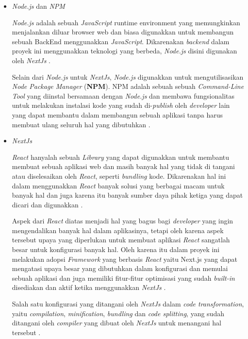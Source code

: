 \documentclass[a4paper]{article}
\begin{document}
\begin{enumerate}[label=\alph*. ]
\begin{enumerate}
\begin{itemize}
                        \item \textit{Node.js} dan \textit{NPM}

                        \textit{Node.js} adalah sebuah \textit{JavaScript} runtime environment yang memungkinkan menjalankan diluar browser web dan biasa digunakkan untuk membangun sebuah BackEnd menggunakkan \textit{JavaScript}. Dikarenakan \textit{backend} dalam proyek ini menggunakkan teknologi yang berbeda, \textit{Node.js} disini digunakan oleh \textit{NextJs} \autocite{Nextjs_use_webpack}.

	                    Selain dari \textit{Node.js} untuk \textit{NextJs}, \textit{Node.js} digunakkan untuk mengutilisasikan \textit{Node Package Manager} (\textbf{NPM}). NPM adalah sebuah sebuah \textit{Command-Line Tool} yang diinstal bersamaan dengan \textit{Node.js} dan membawa fungsionalitas untuk melakukan instalasi kode yang sudah di-\textit{publish} oleh \textit{developer} lain yang dapat membantu dalam membangun sebuah aplikasi tanpa harus membuat ulang seluruh hal yang dibutuhkan \autocite[27-29]{Banks_Porcello_2020}.

                        \item \textit{NextJs}

                        \textit{React} hanyalah sebuah \textit{Library} yang dapat digunakkan untuk membantu membuat sebuah aplikasi web dan masih banyak hal yang tidak di tangani atau diselesaikan oleh \textit{React}, seperti \textit{bundling} kode. Dikarenakan hal ini dalam menggunakkan \textit{React} banyak solusi yang berbagai macam untuk banyak hal dan juga karena itu banyak sumber daya pihak ketiga yang dapat dicari dan digunakkan \autocite{Nextjs_general}.

	                    Aspek dari \textit{React} diatas menjadi hal yang bagus bagi \textit{developer} yang ingin mengendalikan banyak hal dalam aplikasinya, tetapi oleh karena aspek tersebut upaya yang diperlukan untuk membuat aplikasi \textit{React} sangatlah besar untuk konfigurasi banyak hal. Oleh karena itu dalam proyek ini melakukan adopsi \textit{Framework} yang berbasis \textit{React} yaitu Next.js yang dapat mengatasi upaya besar yang dibutuhkan dalam konfigurasi dan memulai sebuah aplikasi dan juga memiliki fitur-fitur optimisasi yang sudah \textit{built-in} disediakan dan aktif ketika menggunakkan \textit{NextJs} \autocite{Nextjs_general}.

	                    Salah satu konfigurasi yang ditangani oleh \textit{NextJs} dalam \textit{code transformation}, yaitu \textit{compilation}, \textit{minification}, \textit{bundling} dan \textit{code splitting}, yang sudah ditangani oleh \textit{compiler} yang dibuat oleh \textit{NextJs} untuk menangani hal tersebut \autocite{Nextjs_compiler}.


\end{itemize}
\end{enumerate}
\end{enumerate}
\end{document}
